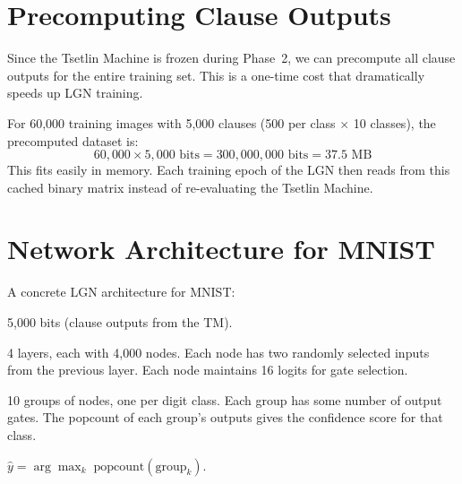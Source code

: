 \section{Precomputing Clause Outputs}
\label{sec:precompute}

Since the Tsetlin Machine is frozen during Phase~2, we can precompute
all clause outputs for the entire training set. This is a one-time
cost that dramatically speeds up LGN training.

\begin{engineernote}
For 60,000 training images with 5,000 clauses (500 per class $\times$
10 classes), the precomputed dataset is:
\[
  60{,}000 \times 5{,}000 \text{ bits}
  = 300{,}000{,}000 \text{ bits}
  = 37.5 \text{ MB}
\]
This fits easily in memory. Each training epoch of the LGN then
reads from this cached binary matrix instead of re-evaluating the
Tsetlin Machine.
\end{engineernote}


\section{Network Architecture for MNIST}
\label{sec:lgn-arch}

A concrete LGN architecture for MNIST:

\begin{description}[leftmargin=1em]
  \item[Input layer:] 5,000 bits (clause outputs from the TM).

  \item[Hidden layers:] 4 layers, each with 4,000 nodes. Each node
    has two randomly selected inputs from the previous layer. Each
    node maintains 16 logits for gate selection.

  \item[Output layer:] 10 groups of nodes, one per digit class. Each
    group has some number of output gates. The popcount of each
    group's outputs gives the confidence score for that class.

  \item[Classification:] $\hat{y} = \arg\max_k \; \text{popcount}
    (\text{group}_k)$.
\end{description}

